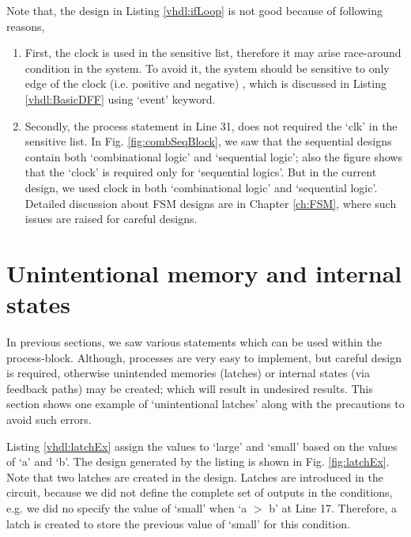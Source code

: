 \begin{noNumBox}
	Note that, the design in Listing \ref{vhdl:ifLoop} is not good because of following reasons,
	\begin{enumerate}		
		\item First, the clock is used in the sensitive list, therefore it may arise race-around condition in the system. To avoid it, the system should be sensitive to only edge of the clock (i.e. positive and negative) , which is discussed in Listing \ref{vhdl:BasicDFF} using `event' keyword.
		
		\item Secondly, the process statement in Line 31, does not required the `clk' in the sensitive list. In Fig. \ref{fig:combSeqBlock}, we saw that the sequential designs contain both `combinational logic' and `sequential logic'; also the figure shows that the `clock' is required  only for `sequential logics'. But in the current design, we used clock in both `combinational logic' and `sequential logic'. Detailed discussion about FSM designs are in Chapter \ref{ch:FSM}, where such issues are raised for careful designs.  
	\end{enumerate}
	
\end{noNumBox}

\section{Unintentional memory and internal states}
In previous sections, we saw various statements which can be used within the process-block. Although, processes are very easy to implement, but careful design is required, otherwise unintended memories (latches) or internal states (via feedback paths) may be created; which will result in undesired results. This section shows one example of `unintentional latches' along with the precautions to avoid such errors. 

Listing \ref{vhdl:latchEx} assign the values to `large' and `small' based on the values of `a' and `b'. The design generated by the listing is shown in Fig. \ref{fig:latchEx}. Note that two latches are created in the design. Latches are introduced in the circuit, because we did not define the complete set of outputs in the conditions, e.g. we did no specify the value of `small' when `a $>$ b' at Line 17. Therefore, a latch is created to store the previous value of `small' for this condition. 



